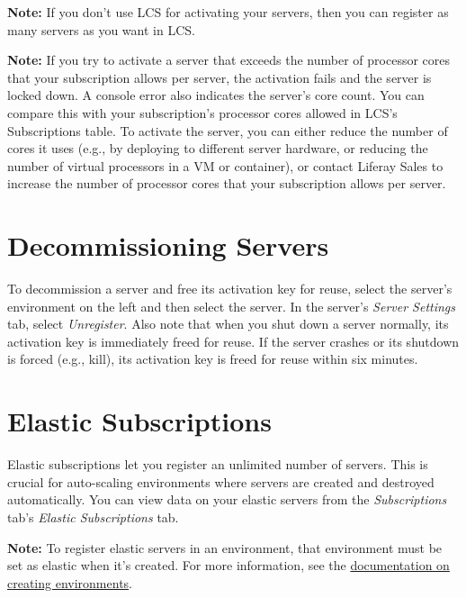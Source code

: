 \noindent\hrulefill

\textbf{Note:} If you don't use LCS for activating your servers, then
you can register as many servers as you want in LCS.

\noindent\hrulefill

\noindent\hrulefill

\textbf{Note:} If you try to activate a server that exceeds the number
of processor cores that your subscription allows per server, the
activation fails and the server is locked down. A console error also
indicates the server's core count. You can compare this with your
subscription's processor cores allowed in LCS's Subscriptions table. To
activate the server, you can either reduce the number of cores it uses
(e.g., by deploying to different server hardware, or reducing the number
of virtual processors in a VM or container), or contact Liferay Sales to
increase the number of processor cores that your subscription allows per
server.

\noindent\hrulefill

\section{Decommissioning Servers}\label{decommissioning-servers}

To decommission a server and free its activation key for reuse, select
the server's environment on the left and then select the server. In the
server's \emph{Server Settings} tab, select \emph{Unregister}. Also note
that when you shut down a server normally, its activation key is
immediately freed for reuse. If the server crashes or its shutdown is
forced (e.g., kill), its activation key is freed for reuse within six
minutes.

\section{Elastic Subscriptions}\label{elastic-subscriptions}

Elastic subscriptions let you register an unlimited number of servers.
This is crucial for auto-scaling environments where servers are created
and destroyed automatically. You can view data on your elastic servers
from the \emph{Subscriptions} tab's \emph{Elastic Subscriptions} tab.

\noindent\hrulefill

\textbf{Note:} To register elastic servers in an environment, that
environment must be set as elastic when it's created. For more
information, see the
\href{/docs/7-2/deploy/-/knowledge_base/d/managing-lcs-environments\#creating-environments}{documentation
on creating environments}.

